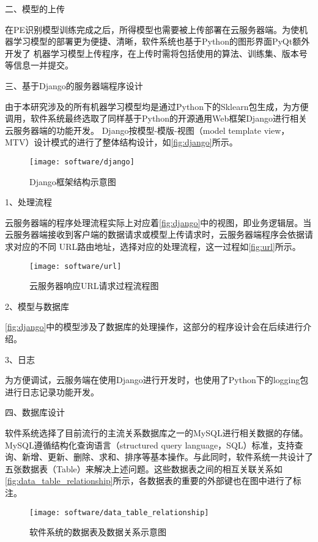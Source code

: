二、模型的上传

在PE识别模型训练完成之后，所得模型也需要被上传部署在云服务器端。为使机器学习模型的部署更为便捷、清晰，软件系统也基于Python的图形界面PyQt额外开发了
机器学习模型上传程序\cite{pyqt,zhiyiYo2023}，在上传时需将包括使用的算法、训练集、版本号等信息一并提交。%

三、基于Django的服务器端程序设计

由于本研究涉及的所有机器学习模型均是通过Python下的Sklearn包生成，为方便调用，软件系统最终选取了同样基于Python的开源通用Web框架Django进行相关云服务器端的功能开发\cite{django}。
Django按模型-模版-视图（model template view，MTV）设计模式的进行了整体结构设计\cite{django}，如\autoref{fig:django}所示。
\begin{figure}[htbp]
    \centering
    \texttt{[image: software/django]}
    \caption[Django框架结构示意图]{\label{fig:django}Django框架结构示意图}
\end{figure}

1、处理流程

云服务器端的程序处理流程实际上对应着\autoref{fig:django}中的视图，即业务逻辑层。当云服务器端接收到客户端的数据请求或模型上传请求时，云服务器端程序会依据请求对应的不同
URL路由地址，选择对应的处理流程，这一过程如\autoref{fig:url}所示。

\begin{figure}[h]
    \centering
    \texttt{[image: software/url]}
    \caption{\label{fig:url}云服务器响应URL请求过程流程图}
\end{figure}

2、模型与数据库

\autoref{fig:django}中的模型涉及了数据库的处理操作，这部分的程序设计会在后续进行介绍。

3、日志

为方便调试，云服务端在使用Django进行开发时，也使用了Python下的logging包进行日志记录功能开发\cite{logging}。

四、数据库设计

软件系统选择了目前流行的主流关系数据库之一的MySQL进行相关数据的存储\cite{mysql}。MySQL遵循结构化查询语言（structured query language，SQL）标准，支持查询、新增、更新、删除、求和、排序等基本操作。与此同时，软件系统一共设计了五张数据表（Table）来解决上述问题。这些数据表之间的相互关联关系如\autoref{fig:data_table_relationship}所示，各数据表的重要的外部键也在图中进行了标注。
\begin{figure}[htbp]
    \centering
    \texttt{[image: software/data\_table\_relationship]}
    \caption{\label{fig:data_table_relationship}软件系统的数据表及数据关系示意图}
\end{figure}

